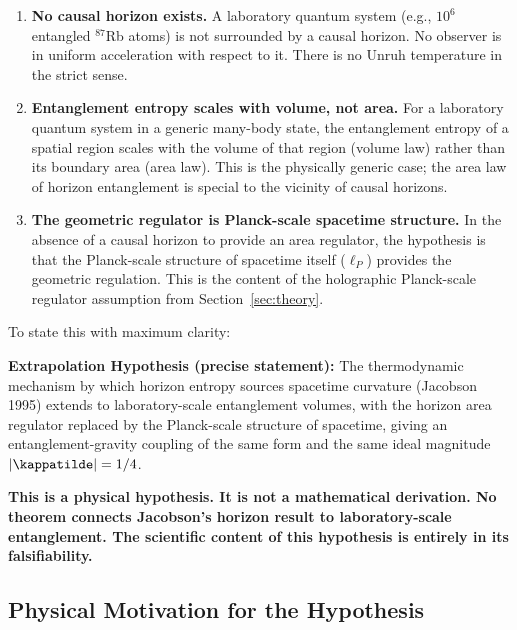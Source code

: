 \begin{enumerate}
    \item \textbf{No causal horizon exists.} A laboratory quantum system
    (e.g., $10^6$ entangled $^{87}$Rb atoms) is not surrounded by a
    causal horizon. No observer is in uniform acceleration with respect
    to it. There is no Unruh temperature in the strict sense.

    \item \textbf{Entanglement entropy scales with volume, not area.}
    For a laboratory quantum system in a generic many-body state, the
    entanglement entropy of a spatial region scales with the volume of
    that region (volume law) rather than its boundary area (area law).
    This is the physically generic case; the area law of horizon
    entanglement is special to the vicinity of causal horizons.

    \item \textbf{The geometric regulator is Planck-scale spacetime
    structure.} In the absence of a causal horizon to provide an area
    regulator, the hypothesis is that the Planck-scale structure of
    spacetime itself ($\ell_P$) provides the geometric regulation.
    This is the content of the holographic Planck-scale regulator
    assumption from Section~\ref{sec:theory}.
\end{enumerate}

\noindent To state this with maximum clarity:

\begin{framed}
\noindent\textbf{Extrapolation Hypothesis (precise statement):}
The thermodynamic mechanism by which horizon entropy sources spacetime
curvature (Jacobson 1995) extends to laboratory-scale entanglement
volumes, with the horizon area regulator replaced by the Planck-scale
structure of spacetime, giving an entanglement-gravity coupling of
the same form and the same ideal magnitude $|\kappatilde| = 1/4$.

\textbf{This is a physical hypothesis. It is not a mathematical
derivation. No theorem connects Jacobson's horizon result to
laboratory-scale entanglement. The scientific content of this
hypothesis is entirely in its falsifiability.}
\end{framed}

\subsection{Physical Motivation for the Hypothesis}
\label{subsec:motivation_hypothesis}

